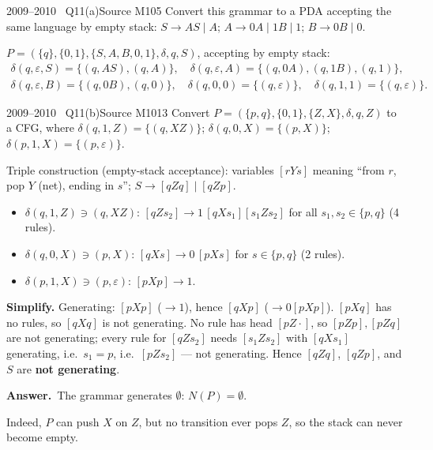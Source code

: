 \documentclass[11pt,a4paper]{article}
\newcommand{\eps}{\varepsilon}
\newcommand{\ans}[1]{\par\smallskip\noindent\colorbox{mist}{\parbox{\dimexpr\linewidth-2\fboxsep}{\sffamily\small\textbf{\color{teal}Answer.}\ \color{ink}#1}}\par}
\begin{document}
\begin{question}{2009--2010 \textbullet\ Q11(a)}{Source M10}{5}
Convert this grammar to a PDA accepting the same language by empty stack: $S\to AS\mid A$; $A\to0A\mid1B\mid1$; $B\to0B\mid0$.
\end{question}
\begin{solution}
$P=(\{q\},\{0,1\},\{S,A,B,0,1\},\delta,q,S)$, accepting by empty stack:
\[\begin{array}{l}
\delta(q,\eps,S)=\{(q,AS),(q,A)\},\quad \delta(q,\eps,A)=\{(q,0A),(q,1B),(q,1)\},\\
\delta(q,\eps,B)=\{(q,0B),(q,0)\},\quad \delta(q,0,0)=\{(q,\eps)\},\quad \delta(q,1,1)=\{(q,\eps)\}.
\end{array}\]
\end{solution}

\begin{question}{2009--2010 \textbullet\ Q11(b)}{Source M10}{13}
Convert $P=(\{p,q\},\{0,1\},\{Z,X\},\delta,q,Z)$ to a CFG, where $\delta(q,1,Z)=\{(q,XZ)\}$; $\delta(q,0,X)=\{(p,X)\}$; $\delta(p,1,X)=\{(p,\eps)\}$.
\end{question}
\begin{solution}
Triple construction (empty-stack acceptance): variables $[rYs]$ meaning ``from $r$, pop $Y$ (net), ending in $s$''; $S\to[qZq]\mid[qZp]$.
\begin{itemize}
\item $\delta(q,1,Z)\ni(q,XZ)$: $[qZs_2]\to1\,[qXs_1][s_1Zs_2]$ for all $s_1,s_2\in\{p,q\}$ (4 rules).
\item $\delta(q,0,X)\ni(p,X)$: $[qXs]\to0\,[pXs]$ for $s\in\{p,q\}$ (2 rules).
\item $\delta(p,1,X)\ni(p,\eps)$: $[pXp]\to1$.
\end{itemize}
\textbf{Simplify.} Generating: $[pXp]$ ($\to1$), hence $[qXp]$ ($\to0[pXp]$). $[pXq]$ has no rules, so $[qXq]$ is not generating. No rule has head $[pZ\cdot]$, so $[pZp],[pZq]$ are not generating; every rule for $[qZs_2]$ needs $[s_1Zs_2]$ with $[qXs_1]$ generating, i.e.\ $s_1=p$, i.e.\ $[pZs_2]$ --- not generating. Hence $[qZq]$, $[qZp]$, and $S$ are \textbf{not generating}.
\ans{The grammar generates $\emptyset$: $N(P)=\emptyset$.}
Indeed, $P$ can push $X$ on $Z$, but no transition ever pops $Z$, so the stack can never become empty.
\end{solution}
\end{document}
